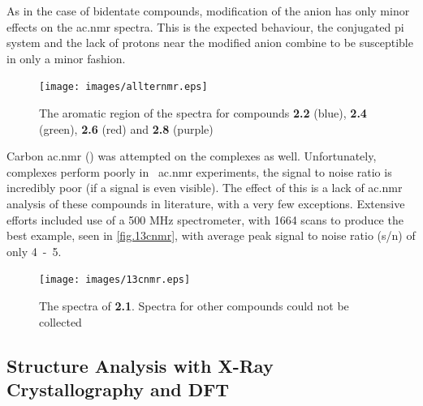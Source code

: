 As in the case of bidentate compounds, modification of the anion has only minor effects on the \gls{ac.nmr} spectra. This is the expected behaviour, the conjugated pi system and the lack of protons near the modified anion combine to be susceptible in only a minor fashion.  

\begin{figure}[!htb]
 \begin{center}
  \texttt{[image: images/allternmr.eps]}
 \end{center}
\caption[The aromatic region of the \texorpdfstring{}{1H}  spectra of the four terdentate compounds]{The aromatic region of the \texorpdfstring{}{1H}  spectra for compounds \textbf{2.2} (blue), \textbf{2.4} (green), \textbf{2.6} (red) and \textbf{2.8} (purple)}
\label{fig.ter4nmr}
\end{figure} 

Carbon \gls{ac.nmr} () was attempted on the complexes as well. Unfortunately,  complexes perform poorly in ~\gls{ac.nmr} experiments, the signal to noise ratio is incredibly poor (if a signal is even visible). The effect of this is a lack of  \gls{ac.nmr} analysis of these compounds in literature, with a very few exceptions. Extensive efforts included use of a 500 MHz spectrometer, with 1664 scans to produce the best example, seen in \autoref{fig.13cnmr}, with average peak signal to noise ratio (s/n) of only 4~-~5.

\begin{figure}[!htb]
 \begin{center}
  \texttt{[image: images/13cnmr.eps]}
 \end{center}
\caption[The 13C  spectra of \textbf{2.1}]{The   spectra of \textbf{2.1}. Spectra for other compounds could not be collected}
\label{fig.13cnmr}
\end{figure} 

\FloatBarrier

\subsection{Structure Analysis with X-Ray Crystallography and DFT}\label{ss.xray}

